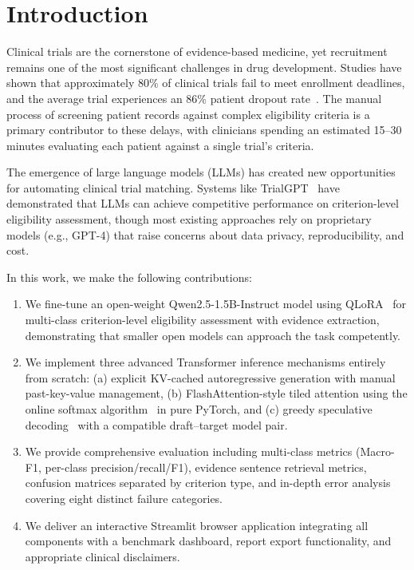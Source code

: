 \documentclass[conference]{IEEEtran}
\begin{document}
\section{Introduction}

Clinical trials are the cornerstone of evidence-based medicine, yet recruitment remains one of the most significant challenges in drug development. Studies have shown that approximately 80\% of clinical trials fail to meet enrollment deadlines, and the average trial experiences an 86\% patient dropout rate~\cite{jin2024trialgpt}. The manual process of screening patient records against complex eligibility criteria is a primary contributor to these delays, with clinicians spending an estimated 15--30 minutes evaluating each patient against a single trial's criteria.

The emergence of large language models (LLMs) has created new opportunities for automating clinical trial matching. Systems like TrialGPT~\cite{jin2024trialgpt} have demonstrated that LLMs can achieve competitive performance on criterion-level eligibility assessment, though most existing approaches rely on proprietary models (e.g., GPT-4) that raise concerns about data privacy, reproducibility, and cost.

In this work, we make the following contributions:

\begin{enumerate}
\item We fine-tune an open-weight Qwen2.5-1.5B-Instruct model using QLoRA~\cite{dettmers2023qlora} for multi-class criterion-level eligibility assessment with evidence extraction, demonstrating that smaller open models can approach the task competently.

\item We implement three advanced Transformer inference mechanisms entirely from scratch: (a) explicit KV-cached autoregressive generation with manual past-key-value management, (b) FlashAttention-style tiled attention using the online softmax algorithm~\cite{dao2022flashattention} in pure PyTorch, and (c) greedy speculative decoding~\cite{leviathan2023fast,chen2023accelerating} with a compatible draft--target model pair.

\item We provide comprehensive evaluation including multi-class metrics (Macro-F1, per-class precision/recall/F1), evidence sentence retrieval metrics, confusion matrices separated by criterion type, and in-depth error analysis covering eight distinct failure categories.

\item We deliver an interactive Streamlit browser application integrating all components with a benchmark dashboard, report export functionality, and appropriate clinical disclaimers.
\end{enumerate}
\end{document}
